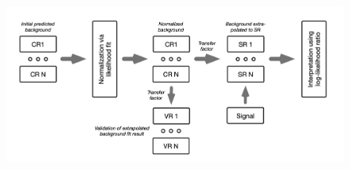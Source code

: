 \documentclass{beamer}
\begin{document}
\begin{frame}
\begin{figure}
\includegraphics[width=1.\textwidth]{regions2}
\end{figure}
\end{frame}
\end{document}

